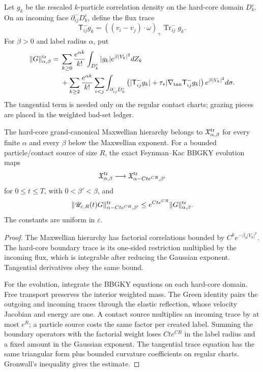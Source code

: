 Let \(g_k\) be the rescaled \(k\)-particle correlation density on the
hard-core domain \(D_k^\varepsilon\).  On an incoming face
\(\partial^-_{ij}D_k^\varepsilon\), define the flux trace
\[
\mathsf T^-_{ij}g_k=
((v_i-v_j)\cdot\omega)_+\operatorname{Tr}^-_{ij}g_k.
\]
For \(\beta>0\) and label radius \(\alpha\), put
\[
\begin{aligned}
\|G\|_{\alpha,\beta}^{\rm tr}
={}&\sum_{k\ge0}\frac{e^{\alpha k}}{k!}
\int_{D_k^\varepsilon}|g_k|e^{\beta|V_k|^2}dZ_k\\
&+\sum_{k\ge2}\frac{e^{\alpha k}}{k!}
\sum_{i<j}
\int_{\partial^-_{ij}D_k^\varepsilon}
\left(|\mathsf T^-_{ij}g_k|+
\tau_*|\nabla_{\tan}\mathsf T^-_{ij}g_k|\right)
 e^{\beta|V_k|^2}d\sigma.
\end{aligned}
\]
The tangential term is needed only on the regular contact charts; grazing
pieces are placed in the weighted bad-set ledger.

\begin{lemma}
\label{lem:r6-b2-trace-class}
The hard-core grand-canonical Maxwellian hierarchy belongs to
\(\mathfrak X_{\alpha,\beta}^{\rm tr}\) for every finite \(\alpha\) and every
\(\beta\) below the Maxwellian exponent.  For a bounded particle/contact
source of size \(R\), the exact Feynman--Kac BBGKY evolution maps
\[
\mathfrak X_{\alpha,\beta}^{\rm tr}
\longrightarrow
\mathfrak X_{\alpha-Cte^{CR},\beta'}^{\rm tr}
\]
for \(0\le t\le T\), with \(0<\beta'<\beta\), and
\[
\|\mathscr U_{\varepsilon,R}(t)G\|_{\alpha-Cte^{CR},\beta'}^{\rm tr}
\le e^{Cte^{CR}}\|G\|_{\alpha,\beta}^{\rm tr}.
\]
The constants are uniform in \(\varepsilon\).
\end{lemma}

\begin{proof}
The Maxwellian hierarchy has factorial correlations bounded by
\(C^ke^{-\beta_0|V_k|^2}\).  The hard-core boundary trace is its one-sided
restriction multiplied by the incoming flux, which is integrable after
reducing the Gaussian exponent.  Tangential derivatives obey the same bound.

For the evolution, integrate the BBGKY equations on each hard-core domain.
Free transport preserves the interior weighted mass.  The Green identity
pairs the outgoing and incoming traces through the elastic reflection, whose
velocity Jacobian and energy are one.  A contact source multiplies an incoming
trace by at most \(e^R\); a particle source costs the same factor per created
label.  Summing the boundary operators with the factorial weight loses
\(Cte^{CR}\) in the label radius and a fixed amount in the Gaussian exponent.
The tangential trace equation has the same triangular form plus bounded
curvature coefficients on regular charts.  Gronwall's inequality gives the
estimate.
\end{proof}

